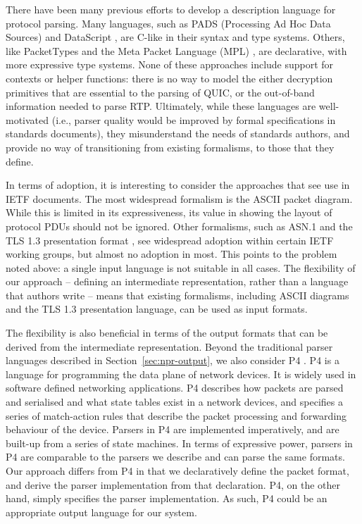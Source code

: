\documentclass[10pt,sigconf]{acmart}
\begin{document}
There have been many previous efforts to develop a description language for protocol
parsing. Many languages, such as PADS (Processing Ad Hoc Data Sources)
\cite{fisher2005pads} and DataScript \cite{back2002datascript}, are C-like in their syntax
and type systems. Others, like PacketTypes \cite{mccann2000packet} and the Meta Packet
Language (MPL) \cite{madhavapeddy2007melange}, are declarative, with more expressive type
systems. None of these approaches include support for contexts or helper functions: there
is no way to model the either decryption primitives that are essential to the parsing of
QUIC, or the out-of-band information needed to parse RTP. Ultimately, while these
languages are well-motivated (i.e., parser quality would be improved by formal
specifications in standards documents), they misunderstand the needs of standards authors,
and provide no way of transitioning from existing formalisms, to those that they define.

In terms of adoption, it is interesting to consider the approaches that see use in IETF
documents. The most widespread formalism is the ASCII packet diagram. While this is
limited in its expressiveness, its value in showing the layout of protocol PDUs should not
be ignored. Other formalisms, such as ASN.1 \cite{x680} and the TLS 1.3 presentation
format \cite{draft-ietf-tls-tls13-28}, see widespread adoption within certain IETF
working groups, but almost no adoption in most. This points to the problem noted above: a
single input language is not suitable in all cases. The flexibility of our approach --
defining an intermediate representation, rather than a language that authors write -- means
that existing formalisms, including ASCII diagrams and the TLS 1.3 presentation language,
can be used as input formats. 

The flexibility is also beneficial in terms of the output formats that can be derived from
the intermediate representation. Beyond the traditional parser languages described in
Section~\ref{sec:npr-output}, we also consider P4
\cite{bosshart:2014:p4,p4consortium:2018:v16spec-20180531}. P4 is a language for
programming the data plane of network devices. It is widely used in software defined
networking applications. P4 describes how packets are parsed and serialised and what state
tables exist in a network devices, and specifies a series of match-action rules that
describe the packet processing and forwarding behaviour of the device. Parsers in P4 are
implemented imperatively, and are built-up from a series of state machines. In terms of
expressive power, parsers in P4 are comparable to the parsers we describe and can parse
the same formats. Our approach differs from P4 in that we declaratively define the packet
format, and derive the parser implementation from that declaration. P4, on the other hand,
simply specifies the parser implementation. As such, P4 could be an appropriate output
language for our system.
\end{document}
